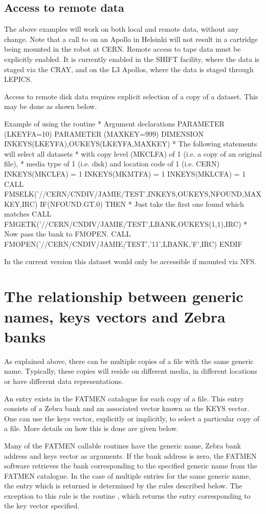 \subsection{Access to remote data}
\par
The above examples will work on both local and remote data, without
any change. Note that a call to  on an Apollo in Helsinki will
not result in a cartridge being mounted in the robot at CERN.
Remote access to tape data must be explicitly enabled. It is currently
enabled in the SHIFT facility, where the data is staged via the CRAY,
and on the L3 Apollos, where the data is staged through LEPICS.
\par
Access to remote disk data requires explicit selection of a copy of 
a dataset. This may be done as shown below.
\begin{XMPt}{Example of using the \protect{} routine}
*     Argument declarations
      PARAMETER (LKEYFA=10)
      PARAMETER (MAXKEY=999)
      DIMENSION INKEYS(LKEYFA),OUKEYS(LKEYFA,MAXKEY)
*     The following statements will select all datasets
*     with copy level (MKCLFA) of 1 (i.e. a copy of an original file),
*     media type of 1 (i.e. disk) and location code of 1 (i.e. CERN)
      INKEYS(MKCLFA) = 1
      INKEYS(MKMTFA) = 1
      INKEYS(MKLCFA) = 1
      CALL FMSELK('//CERN/CNDIV/JAMIE/TEST',INKEYS,OUKEYS,NFOUND,MAXKEY,IRC)
      IF(NFOUND.GT.0) THEN
*     Just take the first one found which matches
         CALL FMGETK('//CERN/CNDIV/JAMIE/TEST',LBANK,OUKEYS(1,1),IRC)
*     Now pass the bank to FMOPEN.
         CALL FMOPEN('//CERN/CNDIV/JAMIE/TEST','11',LBANK,'F',IRC)
      ENDIF
\end{XMPt}
\par
In the current version this dataset would only be accessible if mounted
via NFS.
\section{The relationship between generic names, keys vectors and Zebra banks}
\par
As explained above, there can be multiple copies of a file with the same 
generic name. Typically, these copies will reside on different media,
in different locations or have different data representations.
\par
An entry exists in the FATMEN catalogue for each copy of a file.
This entry consists of a Zebra bank and an associated vector
known as the KEYS vector. One can use the keys vector, explicitly
or implicitly, to select a particular copy of a file. More details
on how this is done are given below.
\par
Many of the FATMEN callable routines have the generic name, Zebra
bank address and keys vector as arguments. If the bank address
is zero, the FATMEN software retrieves the bank corresponding to
the specified generic name from the FATMEN catalogue. In the case of
multiple entries for the same generic name, the entry which is returned
is determined by the rules described below. The exception to this
rule is the routine , which returns the entry corresponding
to the key vector specified.
